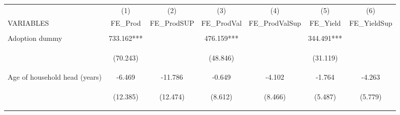 \begin{center}
\begin{tabular}{lcccccc} \hline
 & (1) & (2) & (3) & (4) & (5) & (6) \\
VARIABLES & FE\_Prod & FE\_ProdSUP & FE\_ProdVal & FE\_ProdValSup & FE\_Yield & FE\_YieldSup \\ \hline
\vspace{4pt} & \begin{footnotesize}\end{footnotesize} & \begin{footnotesize}\end{footnotesize} & \begin{footnotesize}\end{footnotesize} & \begin{footnotesize}\end{footnotesize} & \begin{footnotesize}\end{footnotesize} & \begin{footnotesize}\end{footnotesize} \\
Adoption dummy & 733.162*** &  & 476.159*** &  & 344.491*** &  \\
\vspace{4pt} & \begin{footnotesize}(70.243)\end{footnotesize} & \begin{footnotesize}\end{footnotesize} & \begin{footnotesize}(48.846)\end{footnotesize} & \begin{footnotesize}\end{footnotesize} & \begin{footnotesize}(31.119)\end{footnotesize} & \begin{footnotesize}\end{footnotesize} \\
Age of household head (years) & -6.469 & -11.786 & -0.649 & -4.102 & -1.764 & -4.263 \\
\vspace{4pt} & \begin{footnotesize}(12.385)\end{footnotesize} & \begin{footnotesize}(12.474)\end{footnotesize} & \begin{footnotesize}(8.612)\end{footnotesize} & \begin{footnotesize}(8.466)\end{footnotesize} & \begin{footnotesize}(5.487)\end{footnotesize} & \begin{footnotesize}(5.779)\end{footnotesize} \\

\end{tabular}
\end{center}
